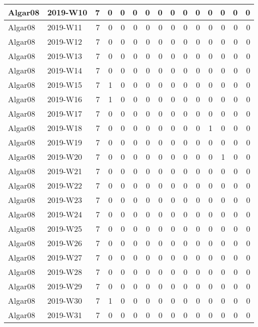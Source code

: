 \documentclass[]{book}
\begin{document}
\begin{table}
\begin{tabular}[t]{l|l|r|r|r|r|r|r|r|r|r|r|r|r|r}
\hline
Algar08 & 2019-W10 & 7 & 0 & 0 & 0 & 0 & 0 & 0 & 0 & 0 & 0 & 0 & 0 & 0\\
\hline
Algar08 & 2019-W11 & 7 & 0 & 0 & 0 & 0 & 0 & 0 & 0 & 0 & 0 & 0 & 0 & 0\\
\hline
Algar08 & 2019-W12 & 7 & 0 & 0 & 0 & 0 & 0 & 0 & 0 & 0 & 0 & 0 & 0 & 0\\
\hline
Algar08 & 2019-W13 & 7 & 0 & 0 & 0 & 0 & 0 & 0 & 0 & 0 & 0 & 0 & 0 & 0\\
\hline
Algar08 & 2019-W14 & 7 & 0 & 0 & 0 & 0 & 0 & 0 & 0 & 0 & 0 & 0 & 0 & 0\\
\hline
Algar08 & 2019-W15 & 7 & 1 & 0 & 0 & 0 & 0 & 0 & 0 & 0 & 0 & 0 & 0 & 0\\
\hline
Algar08 & 2019-W16 & 7 & 1 & 0 & 0 & 0 & 0 & 0 & 0 & 0 & 0 & 0 & 0 & 0\\
\hline
Algar08 & 2019-W17 & 7 & 0 & 0 & 0 & 0 & 0 & 0 & 0 & 0 & 0 & 0 & 0 & 0\\
\hline
Algar08 & 2019-W18 & 7 & 0 & 0 & 0 & 0 & 0 & 0 & 0 & 0 & 1 & 0 & 0 & 0\\
\hline
Algar08 & 2019-W19 & 7 & 0 & 0 & 0 & 0 & 0 & 0 & 0 & 0 & 0 & 0 & 0 & 0\\
\hline
Algar08 & 2019-W20 & 7 & 0 & 0 & 0 & 0 & 0 & 0 & 0 & 0 & 0 & 1 & 0 & 0\\
\hline
Algar08 & 2019-W21 & 7 & 0 & 0 & 0 & 0 & 0 & 0 & 0 & 0 & 0 & 0 & 0 & 0\\
\hline
Algar08 & 2019-W22 & 7 & 0 & 0 & 0 & 0 & 0 & 0 & 0 & 0 & 0 & 0 & 0 & 0\\
\hline
Algar08 & 2019-W23 & 7 & 0 & 0 & 0 & 0 & 0 & 0 & 0 & 0 & 0 & 0 & 0 & 0\\
\hline
Algar08 & 2019-W24 & 7 & 0 & 0 & 0 & 0 & 0 & 0 & 0 & 0 & 0 & 0 & 0 & 0\\
\hline
Algar08 & 2019-W25 & 7 & 0 & 0 & 0 & 0 & 0 & 0 & 0 & 0 & 0 & 0 & 0 & 0\\
\hline
Algar08 & 2019-W26 & 7 & 0 & 0 & 0 & 0 & 0 & 0 & 0 & 0 & 0 & 0 & 0 & 0\\
\hline
Algar08 & 2019-W27 & 7 & 0 & 0 & 0 & 0 & 0 & 0 & 0 & 0 & 0 & 0 & 0 & 0\\
\hline
Algar08 & 2019-W28 & 7 & 0 & 0 & 0 & 0 & 0 & 0 & 0 & 0 & 0 & 0 & 0 & 0\\
\hline
Algar08 & 2019-W29 & 7 & 0 & 0 & 0 & 0 & 0 & 0 & 0 & 0 & 0 & 0 & 0 & 0\\
\hline
Algar08 & 2019-W30 & 7 & 1 & 0 & 0 & 0 & 0 & 0 & 0 & 0 & 0 & 0 & 0 & 0\\
\hline
Algar08 & 2019-W31 & 7 & 0 & 0 & 0 & 0 & 0 & 0 & 0 & 0 & 0 & 0 & 0 & 0\\

\end{tabular}
\end{table}
\end{document}

